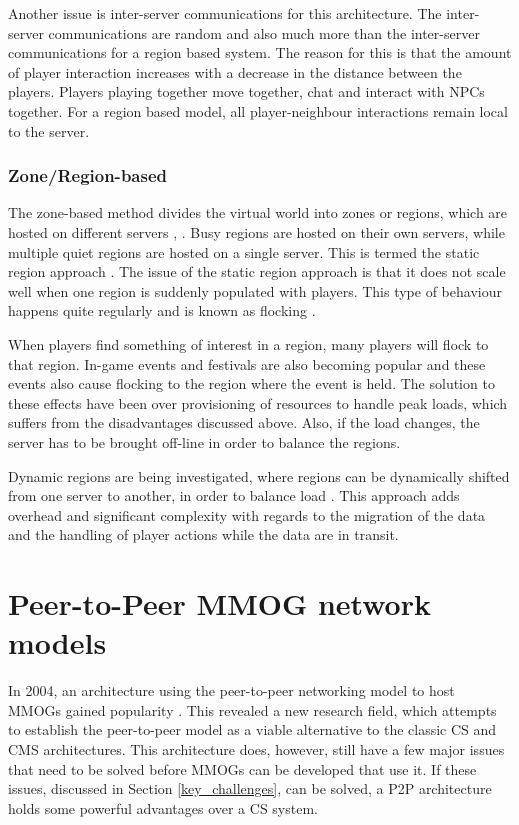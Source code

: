 \documentclass[10pt,a4paper,journal,cspaper,compsoc]{IEEEtran}
\begin{document}
Another issue is inter-server communications for this architecture. The inter-server communications are random and also much more than the
inter-server communications for a region based system. The reason for this is that the amount of player interaction increases with a decrease in the
distance between the players. Players playing together move together, chat and interact with \acp{NPC} together. For a region based model, all
player-neighbour interactions remain local to the server.

\subsubsection{Zone/Region-based}
The zone-based method divides the virtual world into zones or regions, which are hosted on different servers \cite{zone_based_stat},
\cite{zone_based_dyn}. Busy regions are hosted on their own servers, while multiple quiet regions are hosted on a single server. This is termed the
static region approach \cite{zone_based_stat}. The issue of the static region approach is that it does not scale well when one region is suddenly
populated with players. This type of behaviour happens quite regularly and is known as flocking \cite{flocking}.

When players find something of interest in a region, many players will flock to that region. In-game events and festivals are also becoming popular
and these events also cause flocking to the region where the event is held. The solution to these effects have been over provisioning of resources to
handle peak loads, which suffers from the disadvantages discussed above. Also, if the load changes, the server has to be brought off-line in order to
balance the regions.

Dynamic regions are being investigated, where regions can be dynamically shifted from one server to another, in order to balance load
\cite{zone_based_dyn}. This approach adds overhead and significant complexity with regards to the migration of the data and the handling of player
actions while the data are in transit.

\section{Peer-to-Peer MMOG network models}
\label{p2p_network_models}

In 2004, an architecture using the peer-to-peer networking model to host MMOGs gained popularity \cite{knutsson_p2p_first}. This revealed a new
research field, which attempts to establish the peer-to-peer model as a viable alternative to the classic \ac{CS} and \ac{CMS} architectures. This
architecture does, however, still have a few major issues that need to be solved before MMOGs can be developed that use it. If these issues,
discussed in Section \ref{key_challenges}, can be solved, a \ac{P2P} architecture holds some powerful advantages over a \ac{CS} system.
\end{document}
